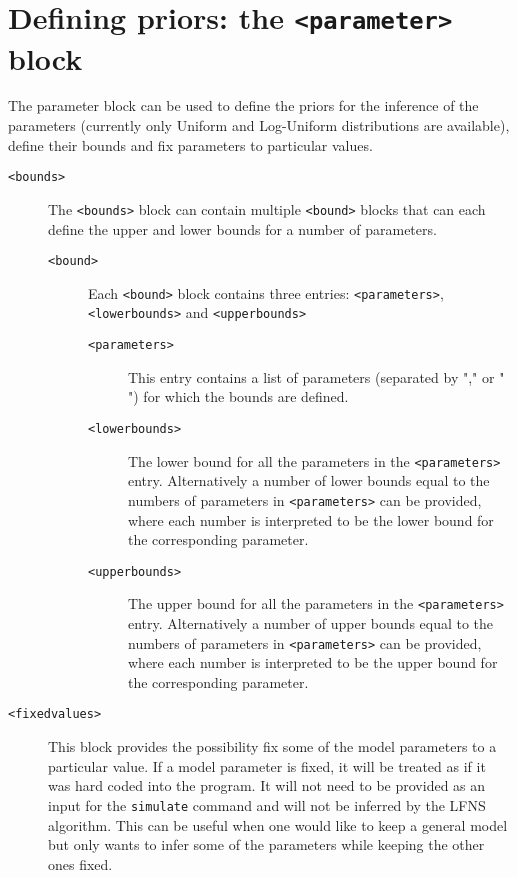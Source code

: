 \documentclass[11pt]{article} %
\begin{document}
\section{Defining priors: the \texttt{<parameter>} block}
The parameter block can be used to define the priors for the inference of the parameters (currently only Uniform and Log-Uniform distributions are available), define their bounds and fix parameters to particular values.  
\begin{description}
	\item[\texttt{<bounds>}] The \texttt{<bounds>} block can contain multiple \texttt{<bound>} blocks that can each define the upper and lower bounds for a number of parameters. 
	\begin{description}
		\item[\texttt{<bound>}] Each \texttt{<bound>} block contains three entries: \texttt{<parameters>}, \texttt{<lowerbounds>} and \texttt{<upperbounds>}
			\begin{description}
				\item[\texttt{<parameters>}] This entry contains a list of parameters (separated by "," or " ") for which the bounds are defined. 
				\item[\texttt{<lowerbounds>}] The lower bound for all the parameters in the \texttt{<parameters>} entry. Alternatively a number of lower bounds equal to the numbers of parameters in \texttt{<parameters>} can be provided, where each number is interpreted to be the lower bound for the corresponding parameter. 
				\item[\texttt{<upperbounds>}] The upper bound for all the parameters in the \texttt{<parameters>} entry. Alternatively a number of upper bounds equal to the numbers of parameters in \texttt{<parameters>} can be provided, where each number is interpreted to be the upper bound for the corresponding parameter. 
			\end{description}
	\end{description}
	\item[\texttt{<fixedvalues>}]\label{it:fixed_values} This block provides the possibility fix some of the model parameters to a particular value. If a model parameter is fixed, it will be treated as if it was hard coded into the program. It will not need to be provided as an input for the \texttt{simulate} command and will not be inferred by the LFNS algorithm. This can be useful when one would like to keep a general model but only wants to infer some of the parameters while keeping the other ones fixed. 
		\begin{description}

\end{description}
\end{description}
\end{document}
